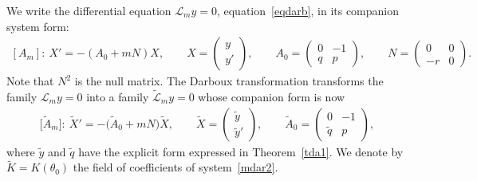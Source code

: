 \documentclass[10pt,a4paper]{amsart}
\numberwithin{equation}{section}
\begin{document}
We write the differential equation ${\mathcal{L}}_my=0$, equation~\eqref{eqdarb}, in its companion system form:
\begin{gather}\label{mdar1}
[A_m]\colon\ X'=-(A_0+mN)X,\qquad\! X=\begin{pmatrix}y \\ y'\end{pmatrix}\!,\qquad\! A_0=\begin{pmatrix}0&-1 \\q&p\end{pmatrix}\!,\qquad\! N=\begin{pmatrix}0&0 \\ -r&0\end{pmatrix}\!.\!\!\!
\end{gather}
Note that $N^2$ is the null matrix.
The Darboux transformation transforms the family ${\mathcal{L}}_my=0$ into a family
$\widetilde{\mathcal L}_my=0$ whose companion form is now
\begin{gather}\label{mdar2}
\big[\widetilde A_m\big]\colon\ \widetilde{X}'=-\big(\widetilde A_0+mN\big) \widetilde{X}, \qquad
\widetilde{X} =\begin{pmatrix}\tilde{y} \\ \tilde{y}' \end{pmatrix}\!, \qquad \widetilde{A}_0=\begin{pmatrix}0&-1 \\\tilde{q}&p\end{pmatrix}\!,
\end{gather}
where $\tilde{y}$ and $\tilde{q}$ have the explicit form expressed in Theorem~\ref{tda1}. We denote by $\widetilde{K} = K(\theta_0)$ the field of coefficients of system~\eqref{mdar2}.
\end{document}
